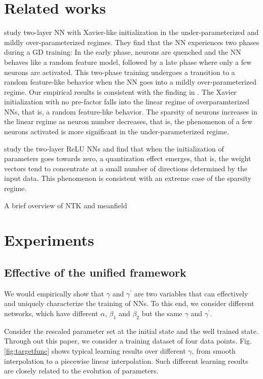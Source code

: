 \documentclass{article}
\begin{document}
\section{Related works}
\cite{ma2020quenching} study two-layer NN with Xavier-like initialization in the under-parameterized and mildly over-parameterized regimes. They find that the NN experiences two phases during a GD training: In the early phase, neurons are quenched and the NN behaves like a random feature model, followed by a late phase where only a few neurons are activated. This two-phase training undergoes a transition to a random feature-like behavior when the NN goes into a mildly over-parameterized regime.  Our empirical results is consistent with the finding in \cite{ma2020quenching}. The Xavier initialization with no pre-factor falls into the linear regime of overparamterized NNs, that is, a random feature-like behavior. The sparsity of neurons increases in the linear regime as neuron number decreases, that is, the phenomenon of a few neurons activated is more significant in the under-parameterized regime.

\cite{maennel2018gradient} study the two-layer ReLU NNs and find that when the initialization of parameters goes towards zero, a quantization effect emerges, that is, the weight vectors tend to concentrate at a small number of directions determined by the
input data. This phenomenon is consistent with an extreme case of the sparsity regime.

A brief overview of NTK and meanfield

\section{Experiments}
\subsection{Effective of the unified framework}

We would empirically show that  $\gamma$ and $\gamma^{\prime}$ are two variables that can effectively and uniquely characterize the training of NNs. To this end, we consider different networks, which have different $\alpha$, $\beta_1$ and $\beta_2$ but  the same $\gamma$ and $\gamma^{\prime}$.

Consider the rescaled parameter set at the initial state and the well trained state. Through out this paper, we consider a training dataset of four data points. Fig. \ref{fig:targetfunc} shows typical learning results over different $\gamma$, from smooth interpolation to a piecewise linear interpolation. Such different learning results are closely related to the evolution of parameters.
\end{document}
